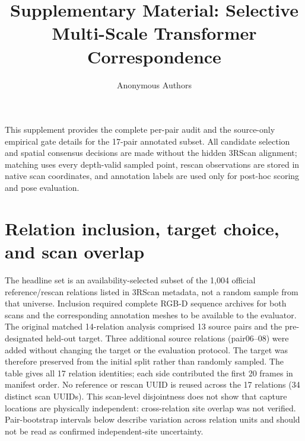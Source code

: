 \documentclass[10pt,twocolumn]{article}
\title{Supplementary Material: Selective Multi-Scale Transformer Correspondence}
\author{Anonymous Authors}
\date{}
\begin{document}
\maketitle

This supplement provides the complete per-pair audit and the source-only
empirical gate details for the 17-pair annotated subset. All candidate selection
and spatial consensus decisions are made without the hidden 3RScan alignment;
matching uses every depth-valid sampled point, rescan observations are stored
in native scan coordinates, and annotation labels are used only for post-hoc
scoring and pose evaluation.

\section{Relation inclusion, target choice, and scan overlap}

The headline set is an availability-selected subset of the 1,004 official
reference/rescan relations listed in 3RScan metadata, not a random sample from
that universe. Inclusion required complete RGB-D sequence archives for both
scans and the corresponding annotation meshes to be available to the evaluator.
The original matched 14-relation analysis comprised 13 source pairs and the
pre-designated held-out target. Three additional source relations (pair06--08)
were added without changing the target or the evaluation protocol. The target
was therefore preserved from the initial split rather than randomly sampled.
The table gives all 17 relation identities; each side contributed the first
20 frames in manifest order. No reference or rescan UUID is reused across the
17 relations (34 distinct scan UUIDs). This scan-level disjointness does not
show that capture locations are physically independent: cross-relation site
overlap was not verified. Pair-bootstrap intervals below describe variation
across relation units and should not be read as confirmed independent-site
uncertainty.
\end{document}
